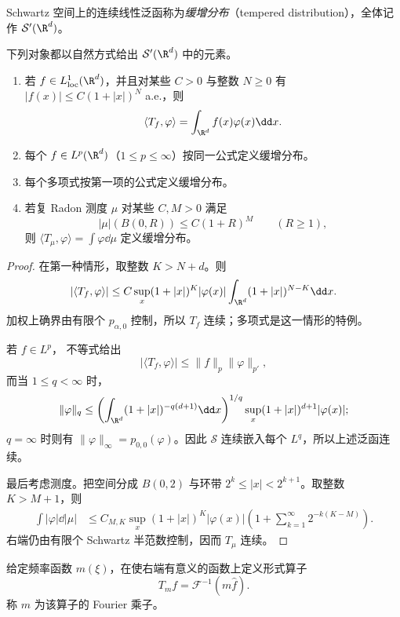 \begin{definition}[缓增分布]\label{def:7-2-3-2}
Schwartz 空间上的连续线性泛函称为\emph{缓增分布}（tempered distribution），全体记作
$\mathcal S'(\R^d)$。
\end{definition}

\begin{proposition}[缓增分布的基本例子]\label{proposition:7-2-3-1}
下列对象都以自然方式给出 $\mathcal S'(\R^d)$ 中的元素。
\begin{enumerate}
  \item 若 $f\in L^1_{\mathrm{loc}}(\R^d)$，并且对某些 $C>0$ 与整数 $N\geq0$ 有
  $|f(x)|\leq C(1+|x|)^N$ a.e.，则
  \[
    \langle T_f,\varphi\rangle=\int_{\R^d}f(x)\varphi(x)\dd x.
  \]
  \item 每个 $f\in L^p(\R^d)$（$1\leq p\leq\infty$）按同一公式定义缓增分布。
  \item 每个多项式按第一项的公式定义缓增分布。
  \item 若复 Radon 测度 $\mu$ 对某些 $C,M>0$ 满足
  \[
    |\mu|(B(0,R))\leq C(1+R)^M\qquad(R\geq1),
  \]
  则 $\langle T_\mu,\varphi\rangle=\int\varphi\dd\mu$ 定义缓增分布。
\end{enumerate}
\end{proposition}

\begin{proof}
在第一种情形，取整数 $K>N+d$。则
\[
 |\langle T_f,\varphi\rangle|
 \leq C\sup_x(1+|x|)^K|\varphi(x)|
       \int_{\R^d}(1+|x|)^{N-K}\dd x.
\]
加权上确界由有限个 $p_{\alpha,0}$ 控制，所以 $T_f$ 连续；多项式是这一情形的特例。

若 $f\in L^p$，\Holder{} 不等式给出
\[
 |\langle T_f,\varphi\rangle|
 \leq \|f\|_p\|\varphi\|_{p'},
\]
而当 $1\leq q<\infty$ 时，
\[
 \|\varphi\|_q
 \leq\left(\int_{\R^d}(1+|x|)^{-q(d+1)}\dd x\right)^{1/q}
       \sup_x(1+|x|)^{d+1}|\varphi(x)|;
\]
$q=\infty$ 时则有 $\|\varphi\|_\infty=p_{0,0}(\varphi)$。因此
$\mathcal S$ 连续嵌入每个 $L^q$，所以上述泛函连续。

最后考虑测度。把空间分成 $B(0,2)$ 与环带
$2^k\leq|x|<2^{k+1}$。取整数 $K>M+1$，则
\begin{align*}
 \int|\varphi|\dd|\mu|
 &\leq C_{M,K}\sup_x(1+|x|)^K|\varphi(x)|
   \left(1+\sum_{k=1}^\infty2^{-k(K-M)}\right).
\end{align*}
右端仍由有限个 Schwartz 半范数控制，因而 $T_\mu$ 连续。
\end{proof}

\begin{definition}[Fourier 乘子]\label{def:7-2-3-3}
给定频率函数 $m(\xi)$，在使右端有意义的函数上定义形式算子
\[
 T_mf=\mathcal F^{-1}(m\widehat f).
\]
称 $m$ 为该算子的 Fourier 乘子。
\end{definition}

